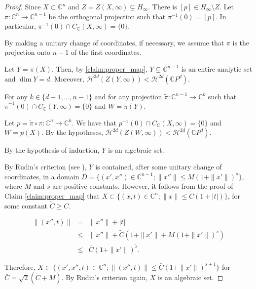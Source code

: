 \documentclass[a4paper,11pt]{amsart}
\newcommand{\C}{\mathbb C}
\begin{document}
\begin{proof}
Since $X\subset \C^n$ and $Z=Z(X,\infty)\subsetneq H_{\infty}$.
There is $[p]\in  H_{\infty}\setminus Z$. Let $\pi\colon \C^n\to \C^{n-1}$ be the orthogonal projection such that $\pi^{-1}(0)=[p]$. In particular, $\pi^{-1}(0)\cap C_{\C}(X,\infty)=\{0\}$.

By making a unitary change of coordinates, if necessary, we assume that $\pi$ is the projection onto $n-1$ of the first coordinates.



Let $Y=\pi(X)$. 
Then, by \ref{claim:proper_map}, $Y\subsetneq \C^{n-1}$ is an entire analytic set and $\dim Y=d$. Moreover, $\mathcal{H}^{2d}(Z(Y,\infty))<\mathcal{H}^{2d}(\mathbb{C}P^{d})$.

For any $k\in\{d+1,...,n-1\}$ and for any projection $\tilde\pi\colon \mathbb{C}^{n-1}\to \mathbb{C}^{k}$ such that $\tilde \pi^{-1}(0)\cap C_{\mathbb{C}}(Y,\infty)=\{0\}$ and $W=\tilde\pi(Y)$.

Let $p=\tilde\pi\circ \pi\colon \mathbb{C}^{n}\to \mathbb{C}^{k}$. We have that $p^{-1}(0)\cap C_{\mathbb{C}}(X,\infty)=\{0\}$ and $W=p(X)$.
By the hypotheses, $\mathcal{H}^{2d}(Z(W,\infty))<\mathcal{H}^{2d}(\mathbb{C}P^{d})$. 

By the hypothesis of induction, $Y$ is an algebraic set.

By Rudin's criterion (see \cite{Rudin:1968}), $Y$ is contained, after some unitary change of coordinates, in a domain 
$D=\{(x',x'')\in\C^{n-1}; \|x''\| \leq M(1+ \|x'\|)^s\}$, where $M$ and $s$ are positive constants. However, it follows from the proof of Claim \ref{claim:proper_map} that $X\subset \{(x,t)\in\C^{n}; \|x\| \leq \tilde C(1+ |t|)\}$, for some constant $\tilde C\geq C$.


\begin{eqnarray*}
    \|(x'',t)\| & = & \|x''\|+|t|\\
    & \leq & \|x''\|+\widetilde{C}(1+\|x'\|+M(1+\|x'\|)^s)\\
    & \leq & \overline{C}(1+\|x'\|)^{\widetilde{s}}.
\end{eqnarray*}


Therefore, $X\subset \{(x',x'',t)\in\C^{n}; \|(x'',t)\| \leq \bar{C}(1+ \|x'\|)^{s+1}\}$ for $\bar{C}=\sqrt{2}(\tilde C+M)$. By Rudin's criterion again, $X$ is an algebraic set.




\end{proof}
\end{document}

